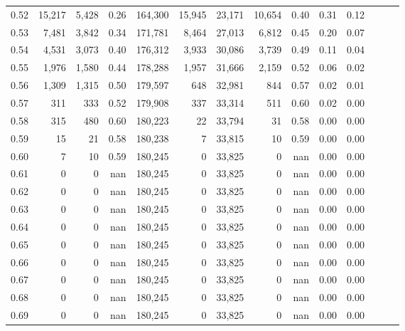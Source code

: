 \begin{tabular}{rrrrrrrrrrrrrr}
0.52 &  15,217 &  5,428 &  0.26 &  164,300 &   15,945 &  23,171 &  10,654 &  0.40 &  0.31 &      0.12 \\
0.53 &   7,481 &  3,842 &  0.34 &  171,781 &    8,464 &  27,013 &   6,812 &  0.45 &  0.20 &      0.07 \\
0.54 &   4,531 &  3,073 &  0.40 &  176,312 &    3,933 &  30,086 &   3,739 &  0.49 &  0.11 &      0.04 \\
0.55 &   1,976 &  1,580 &  0.44 &  178,288 &    1,957 &  31,666 &   2,159 &  0.52 &  0.06 &      0.02 \\
0.56 &   1,309 &  1,315 &  0.50 &  179,597 &      648 &  32,981 &     844 &  0.57 &  0.02 &      0.01 \\
0.57 &     311 &    333 &  0.52 &  179,908 &      337 &  33,314 &     511 &  0.60 &  0.02 &      0.00 \\
0.58 &     315 &    480 &  0.60 &  180,223 &       22 &  33,794 &      31 &  0.58 &  0.00 &      0.00 \\
0.59 &      15 &     21 &  0.58 &  180,238 &        7 &  33,815 &      10 &  0.59 &  0.00 &      0.00 \\
0.60 &       7 &     10 &  0.59 &  180,245 &        0 &  33,825 &       0 &   nan &  0.00 &      0.00 \\
0.61 &       0 &      0 &   nan &  180,245 &        0 &  33,825 &       0 &   nan &  0.00 &      0.00 \\
0.62 &       0 &      0 &   nan &  180,245 &        0 &  33,825 &       0 &   nan &  0.00 &      0.00 \\
0.63 &       0 &      0 &   nan &  180,245 &        0 &  33,825 &       0 &   nan &  0.00 &      0.00 \\
0.64 &       0 &      0 &   nan &  180,245 &        0 &  33,825 &       0 &   nan &  0.00 &      0.00 \\
0.65 &       0 &      0 &   nan &  180,245 &        0 &  33,825 &       0 &   nan &  0.00 &      0.00 \\
0.66 &       0 &      0 &   nan &  180,245 &        0 &  33,825 &       0 &   nan &  0.00 &      0.00 \\
0.67 &       0 &      0 &   nan &  180,245 &        0 &  33,825 &       0 &   nan &  0.00 &      0.00 \\
0.68 &       0 &      0 &   nan &  180,245 &        0 &  33,825 &       0 &   nan &  0.00 &      0.00 \\
0.69 &       0 &      0 &   nan &  180,245 &        0 &  33,825 &       0 &   nan &  0.00 &      0.00 \\

\end{tabular}

